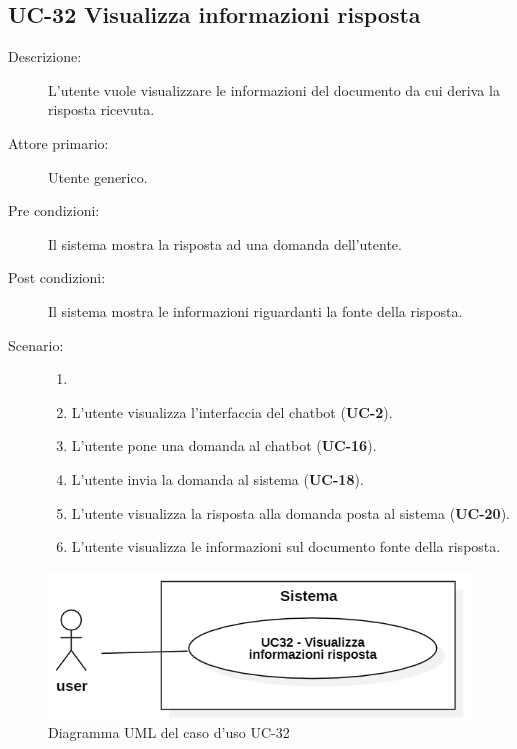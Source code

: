\subsection{UC-32 Visualizza informazioni risposta}
\begin{description}
    \item[Descrizione:] L'utente vuole visualizzare le informazioni del documento da cui deriva la risposta ricevuta.
    \item[Attore primario:] Utente generico.
    \item[Pre condizioni:] Il sistema mostra la risposta ad una domanda dell'utente.
    \item[Post condizioni:] Il sistema mostra le informazioni riguardanti la fonte della risposta.
    \item[Scenario:]
    \begin{enumerate}
        \item[] 
        \item L’utente visualizza l'interfaccia del chatbot (\textbf{UC-2}).
        \item L’utente pone una domanda al chatbot (\textbf{UC-16}).
        \item L'utente invia la domanda al sistema (\textbf{UC-18}).
        \item L'utente visualizza la risposta alla domanda posta al sistema (\textbf{UC-20}).
        \item L'utente visualizza le informazioni sul documento fonte della risposta.
    \end{enumerate}
\end{description}

\begin{figure}[H]
    \centering
    \includegraphics[width=0.9\linewidth]{UC32.PNG}
    \caption{Diagramma UML del caso d'uso UC-32}
    \label{fig:UC32}
\end{figure}

